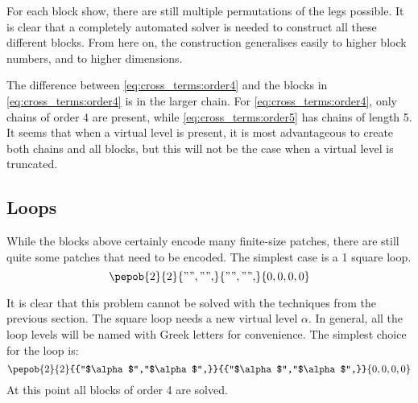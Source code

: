 For each block show, there are still multiple permutations of the legs possible. It is clear that a completely automated solver is needed to construct all these different blocks. From here on, the construction generalises easily to higher block numbers, and to higher dimensions.

The difference between \cref{eq:cross_terms:order4} and the blocks in \cref{eq:cross_terms:order4} is in the larger chain. For \cref{eq:cross_terms:order4}, only chains of order 4 are present, while  \cref{eq:cross_terms:order5} has chains of length 5. It seems that when a virtual level is present, it is most advantageous to create both chains and all blocks, but this will not be the case when a virtual level is truncated.

\subsection{Loops}

While the blocks above certainly encode many finite-size patches, there are still quite some patches that need to be encoded. The simplest case is a 1 square loop.
\begin{equation}
    {\pepob{2}{2}{{"","",}}{{"","",}}{{0,0,0,0}}}
\end{equation}

It is clear that this problem cannot be solved with the techniques from the previous section. The square loop needs a new virtual level $\alpha$. In general, all the loop levels will be named with Greek letters for convenience. The simplest choice for the loop is:
\begin{equation}\label{tikzfig:plaquetter}
    {\pepob{2}{2}{{"$\alpha$","$\alpha$",}}{{"$\alpha$","$\alpha$",}}{{0,0,0,0}}}
\end{equation}
At this point all blocks of order 4 are solved.

